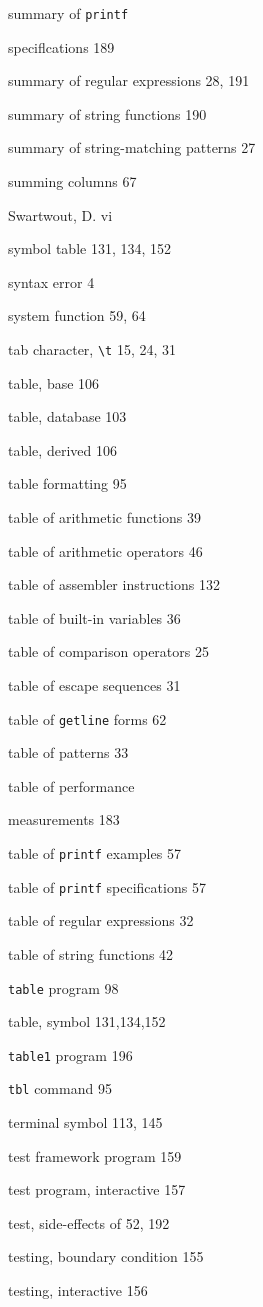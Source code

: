 \begin{multicols}{3}
summary of \verb'printf'

speciflcations 189

summary of regular expressions 28, 191

summary of string functions 190

summary of string-matching patterns 27

summing columns 67

Swartwout, D. vi

symbol table 131, 134, 152

syntax error 4

system function 59, 64

tab character, \verb'\t' 15, 24, 31

table, base 106

table, database 103

table, derived 106

table formatting 95

table of arithmetic functions 39

table of arithmetic operators 46

table of assembler instructions 132

table of built-in variables 36

table of comparison operators 25

table of escape sequences 31

table of \verb'getline' forms 62

table of patterns 33

table of performance

measurements 183

table of \verb'printf' examples 57

table of \verb'printf' specifications 57

table of regular expressions 32

table of string functions 42

\verb'table' program 98

table, symbol 131,134,152

\verb'table1' program 196

\verb'tbl' command 95

terminal symbol 113, 145

test framework program 159

test program, interactive 157

test, side-effects of 52, 192

testing, boundary condition 155

testing, interactive 156


\end{multicols}
